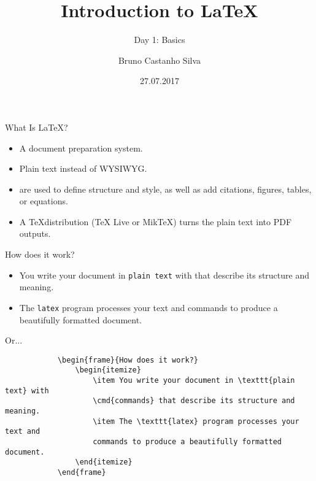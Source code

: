 \documentclass{beamer}
\title{Introduction to \LaTeX}
\author{Bruno Castanho Silva}
\date{27.07.2017}
\subtitle{Day 1: Basics}
\newcommand{\cmd}[1]{{\color[HTML]{008000}\bftt{#1}}}
\begin{document}
\begin{frame}
\titlepage
\end{frame}

 
\begin{frame}{What Is \LaTeX?}
\begin{itemize}
	\item A document preparation system.
	\item Plain text instead of WYSIWYG.
	\item \cmd{commands} are used to define structure and style, as well as add citations, figures, tables, or equations.
	\item A \TeX distribution (TeX Live or MikTeX) turns the plain text into PDF outputs.
\end{itemize} 
\end{frame}
 
\begin{frame}{How does it work?}
		\begin{itemize}
			\item You write your document in \texttt{plain text} with \cmd{commands} that
			describe its structure and meaning.
			\item The \texttt{latex} program processes your text and commands to produce a
			beautifully formatted document.
			\end{itemize}
\end{frame} %
	
\begin{frame}[fragile]{Or...}
		\begin{verbatim}
			\begin{frame}{How does it work?}
				\begin{itemize}
					\item You write your document in \texttt{plain text} with 
					\cmd{commands} that describe its structure and meaning.
					\item The \texttt{latex} program processes your text and 
					commands to produce a beautifully formatted document.
				\end{itemize}
			\end{frame}
			\end{verbatim}
\end{frame}
\end{document}
